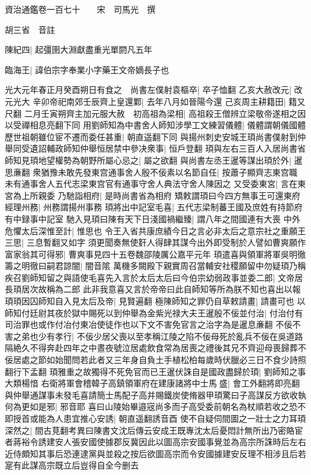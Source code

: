 資治通鑑卷一百七十　　宋　司馬光　撰

胡三省　音註

陳紀四|{
	起彊圉大淵獻盡重光單閼凡五年}


臨海王|{
	諱伯宗字奉業小字藥王文帝嫡長子也}


光大元年春正月癸酉朔日有食之　尚書左僕射袁樞卒|{
	卒子恤翻}
乙亥大赦改元|{
	改元光大}
辛卯帝祀南郊壬辰齊上皇還鄴|{
	去年八月如晉陽今還}
己亥周主耕籍田|{
	籍又尺翻}
二月壬寅朔齊主加元服大赦　初高祖為梁相|{
	高祖殺王僧辨立梁敬帝遂相之因以受禪相息亮翻下同}
用劉師知為中書舍人師知涉學工文練習儀體|{
	儀體謂朝儀國體}
歷世祖朝雖位宦不遷而委任甚重|{
	朝直遥翻下同}
與揚州刺史安城王頊尚書僕射到仲舉同受遺詔輔政師知仲舉恒居禁中參决衆事|{
	恒戶登翻}
頊與左右三百人入居尚書省師知見頊地望權勢為朝野所屬心忌之|{
	屬之欲翻}
與尚書左丞王暹等謀出頊於外|{
	暹思亷翻}
衆猶豫未敢先發東宫通事舍人殷不佞素以名節自任|{
	按蕭子顯齊志東宫職未有通事舍人五代志梁東宫官有通事守舍人典法守舍人陳因之}
又受委東宮|{
	言在東宮為上所親委}
乃馳詣相府|{
	是時尚書省為相府}
矯敕謂頊曰今四方無事王可還東府經理州務|{
	州務謂揚州事務}
頊將出中記室毛喜|{
	五代志梁制蕃王國及庶姓有持節府有中録事中記室}
馳入見頊曰陳有天下日淺國禍繼臻|{
	謂八年之間國連有大喪}
中外危懼太后深惟至計|{
	惟思也}
令王入省共康庶績今日之言必非太后之意宗社之重願王三思|{
	三息暫翻又如字}
須更聞奏無使姧人得肆其謀今出外即受制於人譬如曹爽願作富家翁其可得邪|{
	曹爽事見四十五卷魏邵陵厲公嘉平元年}
頊遣喜與領軍將軍吳明徹籌之明徹曰嗣君諒闇|{
	闇音隂}
萬機多闕殿下親實周召當輔安社稷願留中勿疑頊乃稱疾召劉師知留之與語使毛喜先入言於太后太后曰今伯宗幼弱政事並委二郎|{
	文帝居長頊居次故稱為二郎}
此非我意喜又言於帝帝曰此自師知等所為朕不知也喜出以報頊頊因囚師知自入見太后及帝|{
	見賢遍翻}
極陳師知之罪仍自草敕請畫|{
	請畫可也}
以師知付廷尉其夜於獄中賜死以到仲舉為金紫光禄大夫王暹殷不佞並付治|{
	付治付有司治罪也或作付冶付東冶使徒作也以下文不害免官言之治字為是暹息亷翻}
不佞不害之弟也少有孝行|{
	不佞少居父喪以至孝稱江陵之陷不佞母死於亂兵不佞在吳道路隔絶久不得奔赴四年之中晝夜號泣居處飲食常為居喪之禮後其兄不齊迎母喪歸葬不佞居處之節如始聞問若此者又三年身自負土手植松柏每歲時伏臘必三日不食少詩照翻行下孟翻}
頊雅重之故獨得不死免官而已王暹伏誅自是國政盡歸於頊|{
	劉師知之事大類楊愔}
右衛將軍會稽韓子高鎮領軍府在建康諸將中士馬盛|{
	會工外翻將即亮翻}
與仲舉通謀事未發毛喜請簡士馬配子高并賜鐵炭使脩器甲頊驚曰子高謀反方欲收執何為更如是邪|{
	邪音耶}
喜曰山陵始畢邉宼尚多而子高受委前朝名為杖順若收之恐不即授首或能為人患宜推心安誘|{
	朝直遥翻誘音酉}
使不自疑伺間圖之一壯士之力耳頊深然之|{
	間古莧翻考異曰陳書文沈后傳云安成王既專沈太后憂悶計無所出乃密賂宦者蔣裕令誘建安人張安國使據郡反冀因此以圖高宗安國事覺並為高宗所誅時后左右近侍頗知其事后恐連逮黨與並殺之按后欲圖高宗而令安國據建安反理不相涉且后若寔有此謀高宗既立后豈得自全今删去}
